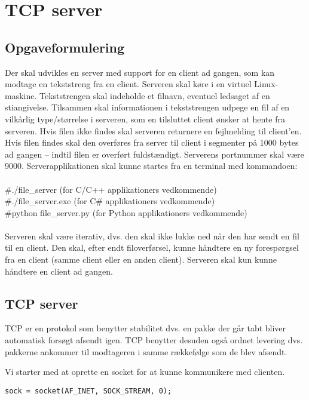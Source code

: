 \chapter{TCP server}

\section{Opgaveformulering}

Der skal udvikles en server med support for en client ad gangen, som kan modtage
en tekststreng fra en client. Serveren skal køre i en virtuel Linux-maskine.
Tekststrengen skal indeholde et filnavn, eventuel ledsaget af en stiangivelse.
Tilsammen skal informationen i tekststrengen udpege en fil af en vilkårlig
type/størrelse i serveren, som en tilsluttet client ønsker at hente fra serveren. Hvis
filen ikke findes skal serveren returnere en fejlmelding til client’en. Hvis filen findes
skal den overføres fra server til client i segmenter på 1000 bytes ad gangen – indtil
filen er overført fuldstændigt. Serverens portnummer skal være 9000. Serverapplikationen
skal kunne startes fra en terminal med kommandoen:\\ \\
\#./file\_server (for C/C++ applikationers vedkommende)\\
\#./file\_server.exe (for C\# applikationers vedkommende)\\
\#python file\_server.py (for Python applikationers vedkommende)\\ \\
Serveren skal være iterativ, dvs. den skal ikke lukke ned når den har sendt en fil til en
client. Den skal, efter endt filoverførsel, kunne håndtere en ny forespørgsel fra en
client (samme client eller en anden client).
Serveren skal kun kunne håndtere en client ad gangen.

\section{TCP server}

TCP er en protokol som benytter stabilitet dvs. en pakke der går tabt bliver automatisk forsøgt afsendt igen. TCP benytter desuden også ordnet levering dvs. pakkerne ankommer til modtageren i samme rækkefølge som de blev afsendt.

Vi starter med at oprette en socket for at kunne kommunikere med clienten. \\

\begin{lstlisting}
sock = socket(AF_INET, SOCK_STREAM, 0);
\end{lstlisting}

